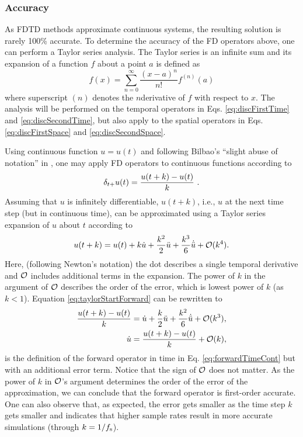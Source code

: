 \subsubsection{Accuracy}
As FDTD methods approximate continuous systems, the resulting solution is rarely 100\% accurate. To determine the accuracy of the FD operators above, one can perform a Taylor series analysis. The Taylor series is an infinite sum and its expansion of a function $f$ about a point $a$ is defined as
\begin{equation}
    f(x) = \sum_{n=0}^{\infty} \frac{(x-a)^n}{n!}f^{(n)}(a)
\end{equation}
where superscript $(n)$ denotes the $n$\th derivative of $f$ with respect to $x$. The analysis will be performed on the temporal operators in Eqs. \eqref{eq:discFirstTime} and \eqref{eq:discSecondTime},  but also apply to the spatial operators in Eqs. \eqref{eq:discFirstSpace} and \eqref{eq:discSecondSpace}.

Using continuous function $u=u(t)$ and following Bilbao's ``slight abuse of notation'' in \cite{theBible}, one may apply FD operators to continuous functions according to 
\begin{equation}\label{eq:forwardTimeCont}
    \delta_{t+} u(t) = \frac{u(t+k) - u(t)}{k}\ .
\end{equation}
%
Assuming that $u$ is infinitely differentiable, $u(t+k)$, i.e., $u$ at the next time step (but in continuous time), can be approximated using a Taylor series expansion of $u$ about $t$ according to
\begin{equation}\label{eq:taylorStartForward}
    u(t+k) = u(t) + k \dot u + \frac{k^2}{2} \ddot u + \frac{k^3}{6} \dot{\ddot{u}} + \mathcal{O}(k^4).
\end{equation}
Here, (following Newton's notation) the dot describes a single temporal derivative and $\mathcal{O}$ includes additional terms in the expansion. The power of $k$ in the argument of $\mathcal{O}$ describes the order of the error, which is lowest power of $k$ (as $k < 1$). Equation \eqref{eq:taylorStartForward} can be rewritten to 
\begin{align}
    \frac{u(t+k) - u(t)}{k} &= \dot u + \frac{k}{2} \ddot u +\frac{k^2}{6} \dot{\ddot{u}} + \mathcal{O}(k^3),\nonumber\\
    \dot u &= \frac{u(t+k) - u(t)}{k} + \mathcal{O}(k),
\end{align}
is the definition of the forward operator in time in Eq. \eqref{eq:forwardTimeCont} but with an additional error term. Notice that the sign of $\mathcal{O}$ does not matter.
As the power of $k$ in $\mathcal{O}$'s argument determines the order of the error of the approximation, we can conclude that the forward operator is first-order accurate. One can also observe that, as expected, the error gets smaller as the time step $k$ gets smaller and indicates that higher sample rates result in more accurate simulations (through $k=1/f_\text{s}$).

